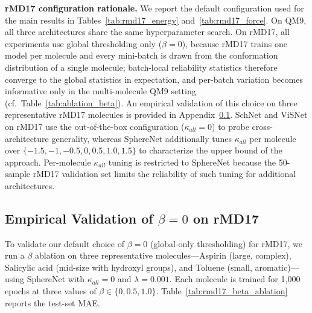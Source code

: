 \textbf{rMD17 configuration rationale.} We report the default configuration used for the main results in Tables~\ref{tab:rmd17_energy} and~\ref{tab:rmd17_force}. On QM9, all three architectures share the same hyperparameter search. On rMD17, all experiments use global thresholding only ($\beta\!=\!0$), because rMD17 trains one model per molecule and every mini-batch is drawn from the conformation distribution of a single molecule; batch-local reliability statistics therefore converge to the global statistics in expectation, and per-batch variation becomes informative only in the multi-molecule QM9 setting (cf.\ Table~\ref{tab:ablation_beta}). An empirical validation of this choice on three representative rMD17 molecules is provided in Appendix~\ref{app:beta_rmd17}. SchNet and ViSNet on rMD17 use the out-of-the-box configuration ($\kappa_{all}\!=\!0$) to probe cross-architecture generality, whereas SphereNet additionally tunes $\kappa_{all}$ per molecule over $\{-1.5, -1, -0.5, 0, 0.5, 1.0, 1.5\}$ to characterize the upper bound of the approach. Per-molecule $\kappa_{all}$ tuning is restricted to SphereNet because the 50-sample rMD17 validation set limits the reliability of such tuning for additional architectures.


\subsection{Empirical Validation of $\beta\!=\!0$ on rMD17}
\label{app:beta_rmd17}

To validate our default choice of $\beta\!=\!0$ (global-only thresholding) for rMD17, we run a $\beta$ ablation on three representative molecules---Aspirin (large, complex), Salicylic acid (mid-size with hydroxyl groups), and Toluene (small, aromatic)---using SphereNet with $\kappa_{all}\!=\!0$ and $\lambda\!=\!0.001$. Each molecule is trained for 1{,}000 epochs at three values of $\beta\in\{0, 0.5, 1.0\}$. Table~\ref{tab:rmd17_beta_ablation} reports the test-set MAE.

